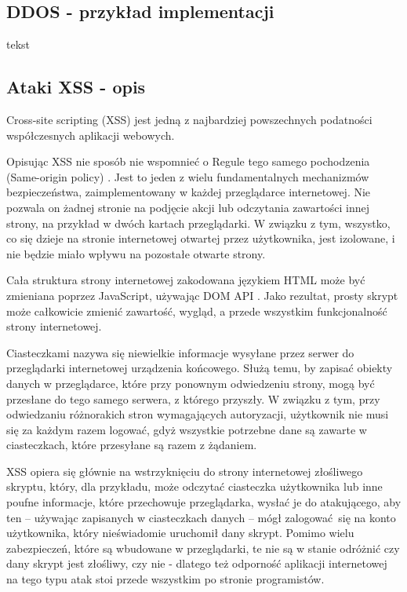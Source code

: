 \documentclass[12pt,twoside]{article}
\begin{document}
\subsection{DDOS - przykład implementacji}
tekst
\subsection{Ataki XSS - opis}

Cross-site scripting (XSS) jest jedną z najbardziej powszechnych podatności współczesnych aplikacji webowych.

Opisując XSS nie sposób nie wspomnieć o Regule tego samego pochodzenia (Same-origin policy) \cite{SameOriginPolicy}. Jest to jeden z wielu fundamentalnych mechanizmów bezpieczeństwa, zaimplementowany w każdej przeglądarce internetowej. Nie pozwala on żadnej stronie na podjęcie akcji lub odczytania zawartości innej strony, na przykład w dwóch kartach przeglądarki. W związku z tym, wszystko, co się dzieje na stronie internetowej otwartej przez użytkownika, jest izolowane, i nie będzie miało wpływu na pozostałe otwarte strony.

Cała struktura strony internetowej zakodowana językiem HTML może być zmieniana poprzez JavaScript, używając DOM API \cite{DOM}. Jako rezultat, prosty skrypt może całkowicie zmienić zawartość, wygląd, a przede wszystkim funkcjonalność strony internetowej.

Ciasteczkami \cite{Cookies} nazywa się niewielkie informacje wysyłane przez serwer do przeglądarki internetowej urządzenia końcowego. Służą temu, by zapisać obiekty danych w przeglądarce, które przy ponownym odwiedzeniu strony, mogą być przesłane do tego samego serwera, z którego przyszły. W związku z tym, przy odwiedzaniu różnorakich stron wymagających autoryzacji, użytkownik nie musi się za każdym razem logować, gdyż wszystkie potrzebne dane są zawarte w ciasteczkach, które przesyłane są razem z żądaniem.

XSS opiera się głównie na wstrzyknięciu do strony internetowej złośliwego skryptu, który, dla przykładu, może odczytać ciasteczka użytkownika lub inne poufne informacje, które przechowuje przeglądarka, wysłać je do atakującego, aby ten -- używając zapisanych w ciasteczkach danych -- mógł zalogować się na konto użytkownika, który nieświadomie uruchomił dany skrypt. Pomimo wielu zabezpieczeń, które są wbudowane w przeglądarki, te nie są w stanie odróżnić czy dany skrypt jest złośliwy, czy nie - dlatego też odporność aplikacji internetowej na tego typu atak stoi przede wszystkim po stronie programistów.
\end{document}
